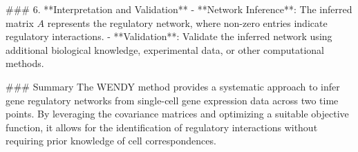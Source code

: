 ### 6. **Interpretation and Validation**
   - **Network Inference**: The inferred matrix \( A \) represents the regulatory network, where non-zero entries indicate regulatory interactions.
   - **Validation**: Validate the inferred network using additional biological knowledge, experimental data, or other computational methods.

### Summary
The WENDY method provides a systematic approach to infer gene regulatory networks from single-cell gene expression data across two time points. By leveraging the covariance matrices and optimizing a suitable objective function, it allows for the identification of regulatory interactions without requiring prior knowledge of cell correspondences.